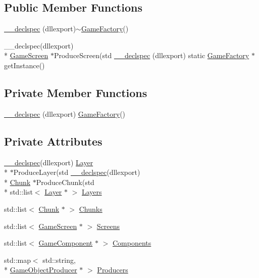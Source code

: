 \subsection*{Public Member Functions}
\begin{DoxyCompactItemize}
\item 
\hyperlink{class_game_factory_adaa8f1b9fe44c066743b786d1cd71bfb}{\-\_\-\-\_\-declspec} (dllexport)$\sim$\hyperlink{class_game_factory}{Game\-Factory}()
\item 
\-\_\-\-\_\-declspec(dllexport) \\*
\hyperlink{class_game_screen}{Game\-Screen} $\ast$Produce\-Screen(std \hyperlink{class_game_factory_a953bc9597060a20c65b2e3cafb5cb2d2}{\-\_\-\-\_\-declspec} (dllexport) static \hyperlink{class_game_factory}{Game\-Factory} $\ast$get\-Instance()
\end{DoxyCompactItemize}
\subsection*{Private Member Functions}
\begin{DoxyCompactItemize}
\item 
\hyperlink{class_game_factory_a6cb0bea926e68e7e2a8267e56f37b27e}{\-\_\-\-\_\-declspec} (dllexport) \hyperlink{class_game_factory}{Game\-Factory}()
\end{DoxyCompactItemize}
\subsection*{Private Attributes}
\begin{DoxyCompactItemize}
\item 
\hyperlink{class_game_factory_adaa8f1b9fe44c066743b786d1cd71bfb}{\-\_\-\-\_\-declspec}(dllexport) \hyperlink{class_layer}{Layer} \\*
$\ast$Produce\-Layer(std \hyperlink{class_game_factory_adaa8f1b9fe44c066743b786d1cd71bfb}{\-\_\-\-\_\-declspec}(dllexport) \\*
\hyperlink{class_chunk}{Chunk} $\ast$Produce\-Chunk(std \\*
std\-::list$<$ \hyperlink{class_layer}{Layer} $\ast$ $>$ \hyperlink{class_game_factory_abe6bbfe34d73050414a71f1f454d2884}{Layers}
\item 
std\-::list$<$ \hyperlink{class_chunk}{Chunk} $\ast$ $>$ \hyperlink{class_game_factory_a77496a7ea1e2fa54acb18c499b3bd3bb}{Chunks}
\item 
std\-::list$<$ \hyperlink{class_game_screen}{Game\-Screen} $\ast$ $>$ \hyperlink{class_game_factory_a16a8135f6d6b1b60c0d08b39340b34cc}{Screens}
\item 
std\-::list$<$ \hyperlink{class_game_component}{Game\-Component} $\ast$ $>$ \hyperlink{class_game_factory_a90fc6360610babaf3d2d880f782772b3}{Components}
\item 
std\-::map$<$ std\-::string, \\*
\hyperlink{class_game_object_producer}{Game\-Object\-Producer} $\ast$ $>$ \hyperlink{class_game_factory_ad00e99627ab0f6ac0dbc04c7479084bd}{Producers}
\end{DoxyCompactItemize}


